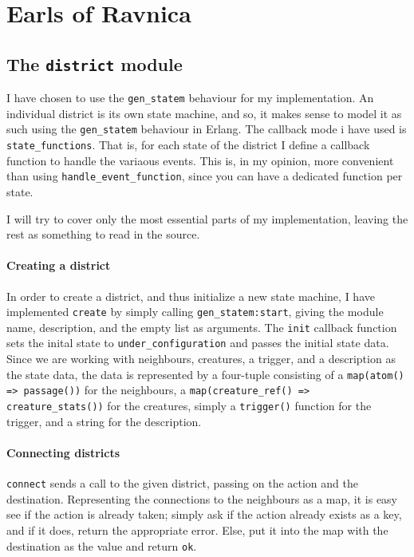 \newpage
\section*{Earls of Ravnica}

\subsection*{The \texttt{district} module}

I have chosen to use the \texttt{gen\_statem} behaviour for my implementation. An individual district is its own state machine, and so, it makes sense to model it as such using the \texttt{gen\_statem} behaviour in Erlang. The callback mode i have used is \texttt{state\_functions}. That is, for each state of the district I define a callback function to handle the variaous events. This is, in my opinion, more convenient than using \texttt{handle\_event\_function}, since you can have a dedicated function per state.

I will try to cover only the most essential parts of my implementation, leaving the rest as something to read in the source.

\paragraph{Creating a district} In order to create a district, and thus initialize a new state machine, I have implemented \texttt{create} by simply calling \texttt{gen\_statem:start}, giving the module name, description, and the empty list as arguments. The \texttt{init} callback function sets the inital state to \texttt{under\_configuration} and passes the initial state data. Since we are working with neighbours, creatures, a trigger, and a description as the state data, the data is represented by a four-tuple consisting of a \texttt{map(atom() => passage())}  for the neighbours, a \texttt{map(creature\_ref() => creature\_stats())} for the creatures, simply a \texttt{trigger()} function for the trigger, and a string for the description.


\paragraph{Connecting districts} \texttt{connect} sends a call to the given district, passing on the action and the destination. Representing the connections to the neighbours as a map, it is easy see if the action is already taken; simply ask if the action already exists as a key, and if it does, return the appropriate error. Else, put it into the map with the destination as the value and return \texttt{ok}.

